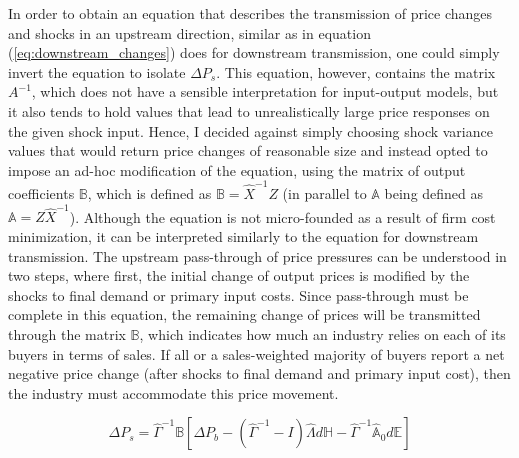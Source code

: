 In order to obtain an equation that describes the transmission of price changes and shocks in an upstream direction, similar as in equation 
(\ref{eq:downstream_changes}) does for downstream transmission, one could simply invert the equation to isolate $\Delta P_s$. This 
equation, however, contains the matrix $A^{-1}$, which does not have a sensible interpretation for input-output models, but it also tends 
to hold values that lead to unrealistically large price responses on the given shock input. Hence, I decided against simply choosing 
shock variance values that would return price changes of reasonable size and instead opted to impose an ad-hoc modification of the 
equation, using the matrix of output coefficients $\mathbb{B}$, which is defined as $\mathbb{B} = \hat{X}^{-1} Z$ (in parallel to 
$\mathbb{A}$ being defined as $\mathbb{A} = Z \hat{X}^{-1}$).  Although the equation is not micro-founded as a result of firm 
cost minimization, it can be interpreted similarly to the equation for downstream transmission. The upstream pass-through of price 
pressures can be understood in two steps, where first, the initial change of output prices is modified by the shocks to final demand or 
primary input costs. Since pass-through must be complete in this equation, the remaining change of prices will be transmitted through 
the matrix $\mathbb{B}$, which indicates how much an industry relies on each of its buyers in terms of sales. If all or a sales-weighted 
majority of buyers report a net negative price change (after shocks to final demand and primary input cost), then the industry must 
accommodate this price movement.

\begin{equation} \label{eq:upstream_changes}
    \Delta P_{s} = \hat{\Gamma}^{-1} \mathbb{B} [\Delta P_{b} - (\hat{\Gamma}^{-1} - I) \hat{\Lambda} d \mathbb{H} - \hat{\Gamma}^{-1} \hat{\mathbb{A}}_0 d \mathbb{E}]
\end{equation}

